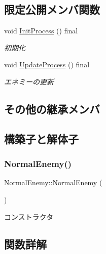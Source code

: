 \subsection*{限定公開メンバ関数}
\begin{DoxyCompactItemize}
\item 
void \mbox{\hyperlink{class_normal_enemy_ae45bd9535595f810d065b92f8dd63342}{Init\+Process}} () final
\begin{DoxyCompactList}\small\item\em 初期化 \end{DoxyCompactList}\item 
void \mbox{\hyperlink{class_normal_enemy_a371a6bef4feaeb0b47e1ab61dead7b77}{Update\+Process}} () final
\begin{DoxyCompactList}\small\item\em エネミーの更新 \end{DoxyCompactList}\end{DoxyCompactItemize}
\subsection*{その他の継承メンバ}


\subsection{構築子と解体子}
\mbox{\label{class_normal_enemy_aa386eea59a2983574fe7d55a91f93012}} 
\subsubsection{\texorpdfstring{Normal\+Enemy()}{NormalEnemy()}}
{\footnotesize\ttfamily Normal\+Enemy\+::\+Normal\+Enemy (\begin{DoxyParamCaption}{ }\end{DoxyParamCaption})\hspace{0.3cm}{\ttfamily [inline]}}



コンストラクタ 



\subsection{関数詳解}
\mbox{\label{class_normal_enemy_ac27e00973d2430da57e044bfe04fe5b4}} 
